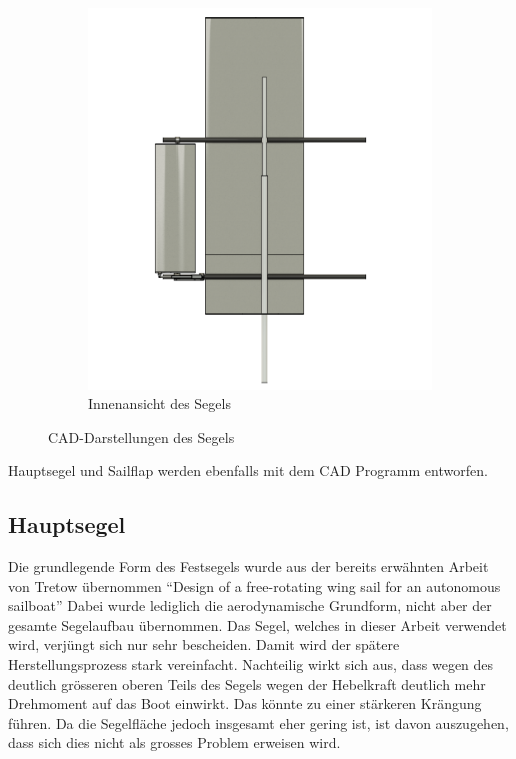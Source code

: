 \begin{figure}[H]
\begin{subfigure}[b]{0.52\linewidth}
        \includegraphics[width=\linewidth]{assets/sail_cad_inner.png}
        \caption{Innenansicht des Segels}
        \label{fig:sailinner}
    \end{subfigure}
    \caption{CAD-Darstellungen des Segels}
    \label{fig:segel_cad_multifig}
\end{figure}

Hauptsegel und Sailflap werden ebenfalls mit dem CAD Programm entworfen. 
\subsection{Hauptsegel}
Die grundlegende Form des Festsegels wurde aus der bereits erwähnten Arbeit  von Tretow übernommen \enquote{Design of a free-rotating wing sail for an autonomous sailboat} \cite{Tretow2017DesignOA}
Dabei wurde lediglich die aerodynamische Grundform, nicht aber der gesamte Segelaufbau übernommen.
Das Segel, welches in dieser Arbeit verwendet wird, verjüngt sich nur sehr bescheiden. Damit wird der spätere Herstellungsprozess stark vereinfacht. Nachteilig wirkt sich aus, dass wegen des deutlich grösseren oberen Teils des Segels wegen der Hebelkraft deutlich mehr Drehmoment auf das Boot einwirkt. Das könnte zu einer stärkeren Krängung führen. Da die Segelfläche jedoch insgesamt eher gering ist, ist davon auszugehen, dass sich dies nicht als grosses Problem erweisen wird.

